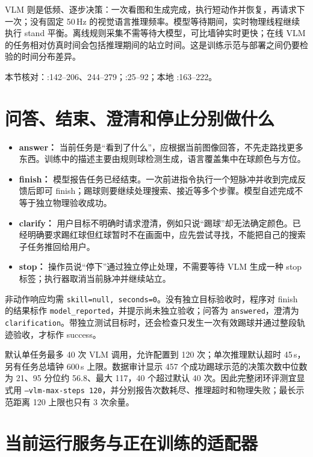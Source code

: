 VLM 则是低频、逐步决策：一次看图和生成完成，执行短动作并恢复，再请求下一次；没有固定 50\,Hz 的视觉语言推理频率。模型等待期间，实时物理线程继续执行 stand 平衡。离线规则采集不需等待大模型，可比墙钟实时更快；在线 VLM 的任务相对仿真时间会包括推理期间的站立时间。这是训练示范与部署之间仍要检验的时间分布差异。

本节核对：:142--206、244--279；:25--92；本地 :163--222。

\section{问答、结束、澄清和停止分别做什么}

\begin{itemize}
\item \textbf{answer：} 当前任务是“看到了什么”，应根据当前图像回答，不先走路找更多东西。训练中的描述主要由规则球检测生成，语言覆盖集中在球颜色与方位。
\item \textbf{finish：} 模型报告任务已经结束。一次前进指令执行一个短脉冲并收到完成反馈后即可 finish；踢球则要继续处理搜索、接近等多个步骤。模型自述完成不等于独立物理验收成功。
\item \textbf{clarify：} 用户目标不明确时请求澄清，例如只说“踢球”却无法确定颜色。已经明确要求踢红球但红球暂时不在画面中，应先尝试寻找，不能把自己的搜索子任务推回给用户。
\item \textbf{stop：} 操作员说“停下”通过独立停止处理，不需要等待 VLM 生成一种 stop 标签；执行器取消当前脉冲并继续站立。
\end{itemize}

非动作响应均需 \texttt{skill=null, seconds=0}。没有独立目标验收时，程序对 finish 的结果标作 \texttt{model\_reported}，并提示尚未独立验收；问答为 \texttt{answered}，澄清为 \texttt{clarification}。带独立测试目标时，还会检查只发生一次有效踢球并通过整段轨迹验收，才标作 success。

默认单任务最多 40 次 VLM 调用，允许配置到 120 次；单次推理默认超时 45\,s，另有任务总墙钟 600\,s 上限。数据审计显示 457 个成功踢球示范的决策次数中位数为 21、95 分位约 56.8、最大 117，40 个超过默认 40 次。因此完整闭环评测宜显式用 \texttt{--vlm-max-steps 120}，并分别报告次数耗尽、推理超时和物理失败；最长示范距离 120 上限也只有 3 次余量。

\section{当前运行服务与正在训练的适配器}

